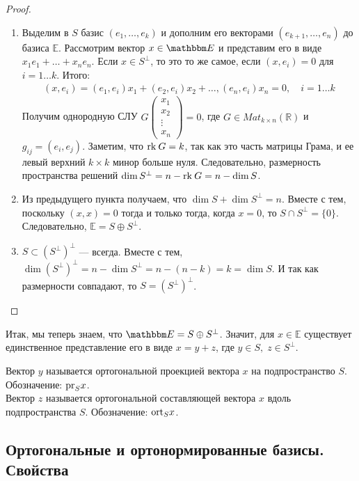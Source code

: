 \begin{proof}\
	\begin{enumerate}
	\item Выделим в $S$ базис $(e_1, \ldots, e_k)$ и дополним его векторами $(e_{k+1}, \ldots, e_n)$ до базиса $\mathbb{E}$. Рассмотрим вектор $x \in \E$ и представим его в виде $x_1e_1 + \ldots + x_ne_n$. Если $x \in S^\perp$, то это то же самое, если $(x, e_i) = 0$ для $i = 1 \ldots k$. Итого:
	\begin{gather*}
		(x,e_i) = (e_1, e_i)x_1 + (e_2, e_i) x_2 + \ldots, (e_n, e_i) x_n= 0, \quad i = 1 \ldots k		
	\end{gather*}
	Получим однородную СЛУ $G\begin{pmatrix}
	x_1\\x_2\\ \vdots\\ x_n
	\end{pmatrix} = 0$, где $G \in Mat_{k\times n}(\mathbb{R})$ и $g_{ij} = (e_i, e_j)$. Заметим, что $\mathrm{rk}\: G =  k$, так как это часть матрицы Грама, и ее левый верхний $k\times k$ минор больше нуля. Следовательно, размерность пространства решений $\dim S^\perp = n - \mathrm{rk}\: G = n - \dim S$.
	\item Из предыдущего пункта получаем, что $\dim S + \dim S^\perp = n$. Вместе с тем, поскольку $(x,x) = 0$ тогда и только тогда, когда $x = 0$, то $S \cap S^\perp = \{0\}$. Следовательно, $\mathbb{E} = S \oplus S^\perp$.
	\item $S \subset (S^\perp)^\perp$ --- всегда. Вместе с тем, $\dim (S^\perp)^\perp = n - \dim S^\perp = n - (n - k) =  k = \dim S$. И так как размерности совпадают, то $S = (S^\perp)^\perp$.
\end{enumerate}
\end{proof}

Итак, мы теперь знаем, что $\E = S \oplus S^\perp$. Значит, для $x \in \mathbb{E}$ существует единственное представление его в виде $x = y + z$, где $y \in S,\; z \in S^\perp$.
\begin{Def}
	Вектор $y$ называется ортогональной проекцией вектора $x$ на подпространство $S$. Обозначение: $\mathrm{pr}_S x$. \\ Вектор $z$ называется ортогональной составляющей вектора $x$ вдоль подпространства $S$. Обозначение: $\mathrm{ort}_S x$.
\end{Def}

\subsection*{Ортогональные и ортонормированные базисы. Свойства}

